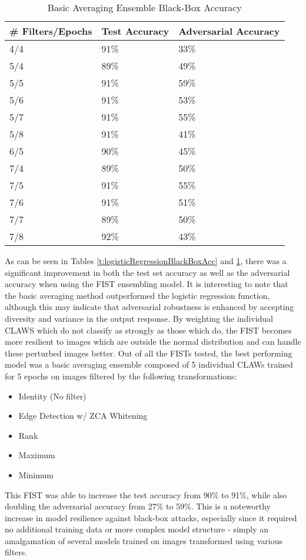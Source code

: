 \begin{table}
    \begin{center}
        \caption{Basic Averaging Ensemble Black-Box Accuracy}
        \label{t:basicAveragingBlackBoxAcc}
        \begin{tabular}{l|l|l}\hline
        \textbf{\# Filters/Epochs} & \textbf{Test Accuracy} & \textbf{Adversarial Accuracy}\\\hline
        4/4 & 91\% & 33\% \\\hline
        5/4 & 89\% & 49\% \\\hline
        5/5 & 91\% & 59\% \\\hline
        5/6 & 91\% & 53\% \\\hline
        5/7 & 91\% & 55\% \\\hline
        5/8 & 91\% & 41\% \\\hline
        6/5 & 90\% & 45\% \\\hline
        7/4 & 89\% & 50\% \\\hline
        7/5 & 91\% & 55\% \\\hline
        7/6 & 91\% & 51\% \\\hline
        7/7 & 89\% & 50\% \\\hline
        7/8 & 92\% & 43\% \\\hline
        \end{tabular}
    \end{center}
\end{table}

As can be seen in Tables \ref{t:logisticRegressionBlackBoxAcc} and \ref{t:basicAveragingBlackBoxAcc}, there was a significant improvement in both the test set accuracy as well as the adversarial accuracy when using the FIST ensembling model.
It is interesting to note that the basic averaging method outperformed the logistic regression function, although this may indicate that adversarial robustness is enhanced by accepting diversity and variance in the output response.
By weighting the individual CLAWS which do not classify as strongly as those which do, the FIST becomes more resilient to images which are outside the normal distribution and can handle these perturbed images better.
Out of all the FISTs tested, the best performing model was a basic averaging ensemble composed of 5 individual CLAWs trained for 5 epochs on images filtered by the following transformations:

\begin{itemize}
    \item Identity (No filter)
    \item Edge Detection w/ ZCA Whitening
    \item Rank
    \item Maximum
    \item Minimum
\end{itemize}

This FIST was able to increase the test accuracy from 90\% to 91\%, while also doubling the adversarial accuracy from 27\% to 59\%.
This is a noteworthy increase in model resilience against black-box attacks, especially since it required no additional training data or more complex model structure - simply an amalgamation of several models trained on images transformed using various filters.
